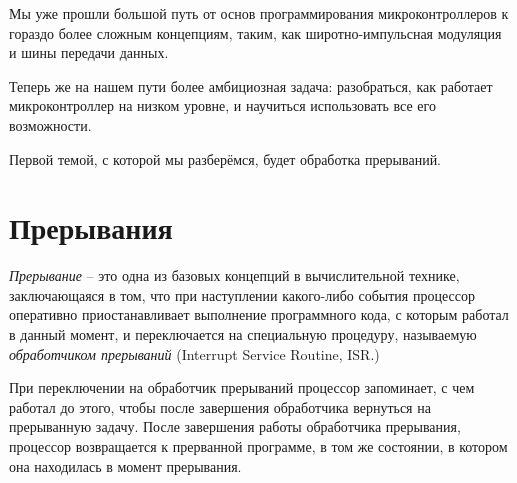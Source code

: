 \documentclass[../sparc.tex]{subfiles}
\begin{document}

Мы уже прошли большой путь от основ программирования микроконтроллеров к гораздо
более сложным концепциям, таким, как широтно-импульсная модуляция и шины
передачи данных.

Теперь же на нашем пути более амбициозная задача: разобраться, как работает
микроконтроллер на низком уровне, и научиться использовать все его возможности.

Первой темой, с которой мы разберёмся, будет обработка прерываний.

\section{Прерывания}
\label{section:interrupts}

\emph{Прерывание} -- это одна из базовых концепций в вычислительной технике,
заключающаяся в том, что при наступлении какого-либо события процессор
оперативно приостанавливает выполнение программного кода, с которым работал в
данный момент, и переключается на специальную процедуру, называемую
\emph{обработчиком прерываний} (Interrupt Service Routine, ISR.)

При переключении на обработчик прерываний процессор запоминает, с чем работал до
этого, чтобы после завершения обработчика вернуться на прерыванную задачу.
После завершения работы обработчика прерывания, процессор возвращается к
прерванной программе, в том же состоянии, в котором она находилась в момент
прерывания.\cite[452-456]{tanenbaum2021-ru}
\end{document}
